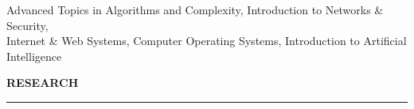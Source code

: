 \documentclass{resume} %
\begin{document}
\hspace*{1mm}{\em Relevant Courses:} Advanced Topics in Algorithms and Complexity, Introduction to Networks \& Security, \\
\hspace*{1mm}Internet \& Web Systems, Computer Operating Systems, Introduction to Artificial Intelligence



\medskip
\MakeUppercase{\bf Research}
\medskip
\hrule
\end{document}
